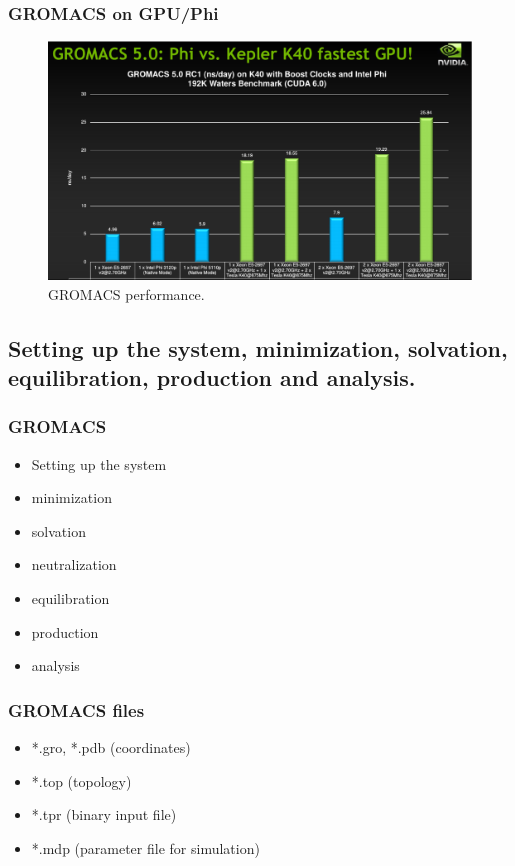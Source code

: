 \documentclass{beamer}
\begin{document}
\begin{frame}
\frametitle{GROMACS on GPU/Phi}

\begin{figure}
\includegraphics[scale=0.28]{gromacs_phi_gpu.eps}
\caption{{\scriptsize  GROMACS performance. }}
\end{figure}

\end{frame}

\subsection{Setting up the system, minimization, solvation, equilibration, production and analysis.}


\begin{frame}
\frametitle{GROMACS}

\begin{itemize}
\item Setting up the system
\item minimization
\item solvation
\item neutralization
\item equilibration
\item production 
\item analysis
\end{itemize}

\end{frame}

\begin{frame}
\frametitle{GROMACS files}
\begin{itemize}
	\item *.gro, *.pdb (coordinates)
	\item *.top (topology)
	\item *.tpr (binary input file)
	\item *.mdp (parameter file for simulation)
\end{itemize}
\end{frame}
\end{document}
